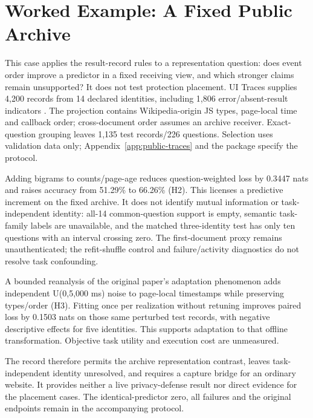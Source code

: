 \section{Worked Example: A Fixed Public Archive}\label{sec:public-traces}
This case applies the result-record rules to a representation question: does event order improve a predictor in a fixed receiving view, and which stronger claims remain unsupported? It does not test protection placement. UI Traces supplies 4,200 records from 14 declared identities, including 1,806 error/absent-result indicators \cite{uitraces2026}. The projection contains Wikipedia-origin JS types, page-local time and callback order; cross-document order assumes an archive receiver. Exact-question grouping leaves 1,135 test records/226 questions. Selection uses validation data only; Appendix~\ref{app:public-traces} and the package specify the protocol.


Adding bigrams to counts/page-age reduces question-weighted loss by 0.3447 nats and raises accuracy from 51.29\% to 66.26\% (H2). This licenses a predictive increment on the fixed archive. It does not identify mutual information or task-independent identity: all-14 common-question support is empty, semantic task-family labels are unavailable, and the matched three-identity test has only ten questions with an interval crossing zero. The first-document proxy remains unauthenticated; the refit-shuffle control and failure/activity diagnostics do not resolve task confounding.

A bounded reanalysis of the original paper's adaptation phenomenon adds independent U(0,5,000 ms) noise to page-local timestamps while preserving types/order (H3). Fitting once per realization without retuning improves paired loss by 0.1503 nats on those same perturbed test records, with negative descriptive effects for five identities. This supports adaptation to that offline transformation. Objective task utility and execution cost are unmeasured.

The record therefore permits the archive representation contrast, leaves task-independent identity unresolved, and requires a capture bridge for an ordinary website. It provides neither a live privacy-defense result nor direct evidence for the placement cases. The identical-predictor zero, all failures and the original endpoints remain in the accompanying protocol.
